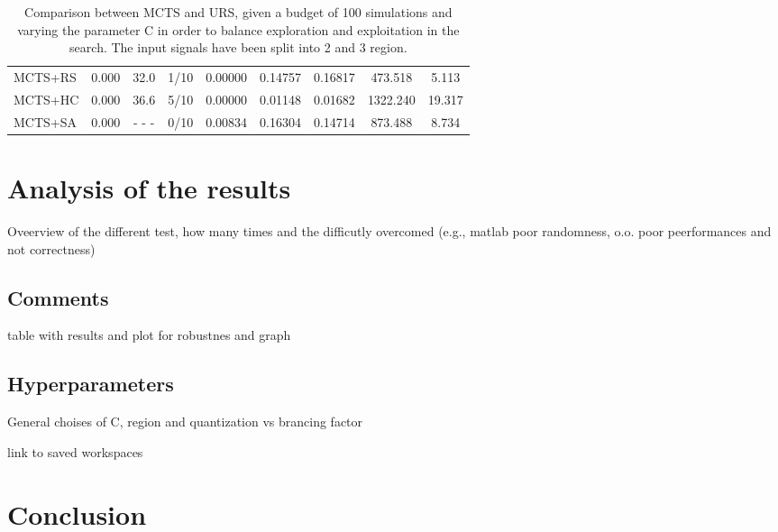 \documentclass[11pt]{article}
\begin{document}
\begin{table}[ht]
\begin{tabular}{|l|l|c|c|c|c|c|c|c|}
MCTS+RS                                     & 0.000              &  32.0                   & 1/10                          & 0.00000  & 0.14757  & 0.16817  &  473.518   &  5.113       \\
MCTS+HC                                     & 0.000              &  36.6                   & 5/10                          & 0.00000  & 0.01148  & 0.01682  & 1322.240   & 19.317       \\
MCTS+SA                                     & 0.000              & - - -                   & 0/10                          & 0.00834  & 0.16304  & 0.14714  &  873.488   &  8.734       \\ \hline
\end{tabular}
\caption{Comparison between MCTS and URS, given a budget of 100 simulations and varying the parameter C in order to balance exploration and exploitation in the search. The input signals have been split into 2 and 3 region.}
\end{table}
\pagebreak

\section{Analysis of the results}
Oveerview of the different test, how many times and the difficutly overcomed (e.g., matlab poor randomness, o.o. poor peerformances and not correctness)

\subsection{Comments}
table with results and plot for robustnes and graph

\subsection{Hyperparameters}
General choises of C, region and quantization vs brancing factor

link to saved workspaces

\section{Conclusion}



\end{document}
